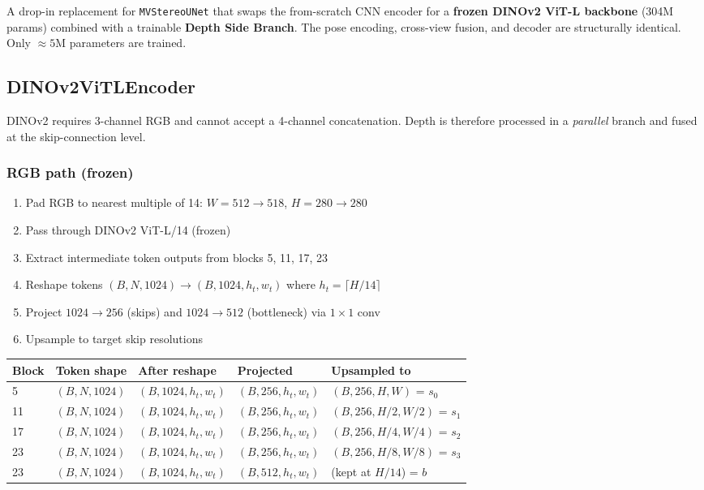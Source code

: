 \documentclass[11pt]{article}
\begin{document}
A drop-in replacement for \texttt{MVStereoUNet} that swaps the from-scratch CNN
encoder for a \textbf{frozen DINOv2 ViT-L backbone} (304M params) combined with
a trainable \textbf{Depth Side Branch}.  The pose encoding, cross-view fusion,
and decoder are structurally identical.  Only $\approx 5$M parameters are
trained.

\subsection{DINOv2ViTLEncoder}

DINOv2 requires 3-channel RGB and cannot accept a 4-channel concatenation.
Depth is therefore processed in a \emph{parallel} branch and fused at the
skip-connection level.

\subsubsection{RGB path (frozen)}

\begin{enumerate}[leftmargin=2em]
  \item Pad RGB to nearest multiple of 14: $W=512 \to 518$, $H=280 \to 280$
  \item Pass through DINOv2 ViT-L/14 (frozen)
  \item Extract intermediate token outputs from blocks 5, 11, 17, 23
  \item Reshape tokens $(B, N, 1024) \to (B, 1024, h_t, w_t)$ where $h_t = \lceil H/14 \rceil$
  \item Project $1024 \to 256$ (skips) and $1024 \to 512$ (bottleneck) via $1\times1$ conv
  \item Upsample to target skip resolutions
\end{enumerate}

\begin{center}
\begin{tabular}{lllll}
\toprule
\textbf{Block} & \textbf{Token shape} & \textbf{After reshape} & \textbf{Projected} & \textbf{Upsampled to} \\
\midrule
5  & $(B,N,1024)$ & $(B,1024,h_t,w_t)$ & $(B,256,h_t,w_t)$ & $(B,256,H,W)$       = $s_0$ \\
11 & $(B,N,1024)$ & $(B,1024,h_t,w_t)$ & $(B,256,h_t,w_t)$ & $(B,256,H/2,W/2)$   = $s_1$ \\
17 & $(B,N,1024)$ & $(B,1024,h_t,w_t)$ & $(B,256,h_t,w_t)$ & $(B,256,H/4,W/4)$   = $s_2$ \\
23 & $(B,N,1024)$ & $(B,1024,h_t,w_t)$ & $(B,256,h_t,w_t)$ & $(B,256,H/8,W/8)$   = $s_3$ \\
23 & $(B,N,1024)$ & $(B,1024,h_t,w_t)$ & $(B,512,h_t,w_t)$ & (kept at $H/14$)    = $b$   \\
\bottomrule
\end{tabular}
\end{center}
\end{document}
